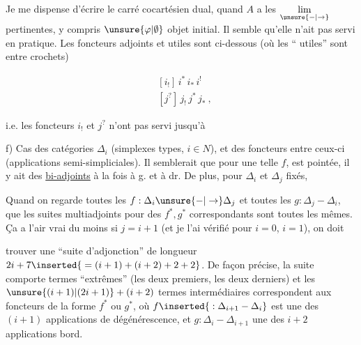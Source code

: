 

Je me dispense d'écrire le carré cocartésien dual, quand $A$ a les $\underset{\unsure{-|\to}}{\lim}$ pertinentes, y compris $\unsure{\varphi|\emptyset}$ objet initial. Il semble qu'elle n'ait pas servi en pratique. Les foncteurs adjoints et   utiles sont   ci-dessous (où les `` utiles'' sont entre crochets)

\[
\begin{aligned}
&[i_{!}]\,i^{*}\,i_{*}\,i^{!}\\
&[j^{?}]\,j_{!}\,j^{*}\,j_{*}\ ,
\end{aligned}
\]

i.e. les foncteurs $i_{!}$ et $j^{?}$ n'ont pas servi jusqu'à 

f) Cas des catégories $\Delta_{i}$ (simplexes types, $i\in N$), et des foncteurs entre ceux-ci (applications semi-simpliciales).  Il semblerait que pour une telle $f$,    est pointée, il y ait des \uline{bi-adjoints} à la fois à g. et à dr. De plus, pour $\Delta_{i}$ et $\Delta_{j}$ fixés,

Quand on regarde toutes les $f:\Delta_{i}\unsure{-|\to}\Delta_{j}$ et toutes les $g:\Delta_{j}-\Delta_{i}$, que les suites   multiadjoints pour  des $f^{*},g^{*}$ correspondants sont toutes les mêmes. Ça a l'air vrai du moins si $j=i+1$ (et je l'ai vérifié pour $i=0$, $i=1$), on doit

trouver une ``suite d'adjonction'' de longueur $2i+7\inserted{{}=(i+1)+(i+2)+2+2}$. De façon  précise, la suite comporte   termes ``extrêmes'' (les deux premiers, les deux derniers) et les $\unsure{(i+1)|(2i+1)}+(i+2)$ termes intermédiaires correspondent aux foncteurs de la forme $f^{*}$ ou $g^{*}$, où $f\inserted{{}:\Delta_{i+1}-\Delta_{i}}$ est une des $(i+1)$ applications de dégénérescence, et $g:\Delta_{i}-\Delta_{i+1}$ une des $i+2$ applications bord.




